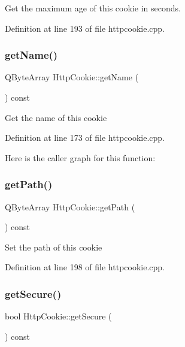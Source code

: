 Get the maximum age of this cookie in seconds. 

Definition at line 193 of file httpcookie.\+cpp.

\mbox{\label{classstefanfrings_1_1_http_cookie_abecd0373e90e3701e82bb4dc630c54a7}} 
\subsubsection{\texorpdfstring{get\+Name()}{getName()}}
{\footnotesize\ttfamily Q\+Byte\+Array Http\+Cookie\+::get\+Name (\begin{DoxyParamCaption}{ }\end{DoxyParamCaption}) const}

Get the name of this cookie 

Definition at line 173 of file httpcookie.\+cpp.

Here is the caller graph for this function\+:
\mbox{\label{classstefanfrings_1_1_http_cookie_a3796862a6c50124eb5c987dd617a097c}} 
\subsubsection{\texorpdfstring{get\+Path()}{getPath()}}
{\footnotesize\ttfamily Q\+Byte\+Array Http\+Cookie\+::get\+Path (\begin{DoxyParamCaption}{ }\end{DoxyParamCaption}) const}

Set the path of this cookie 

Definition at line 198 of file httpcookie.\+cpp.

\mbox{\label{classstefanfrings_1_1_http_cookie_a270cd78805263b5ed80f4e3354caf4e4}} 
\subsubsection{\texorpdfstring{get\+Secure()}{getSecure()}}
{\footnotesize\ttfamily bool Http\+Cookie\+::get\+Secure (\begin{DoxyParamCaption}{ }\end{DoxyParamCaption}) const}

